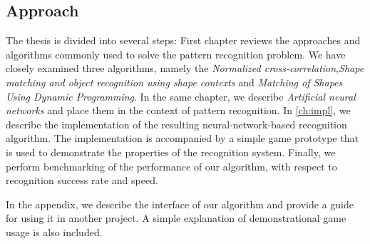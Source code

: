 \subsection{Approach}
The thesis is divided into several steps: First chapter reviews the approaches and algorithms commonly used to solve the pattern recognition problem. We have closely examined three algorithms, namely the \emph{Normalized cross-correlation},\emph{Shape matching and object recognition using shape contexts} and \emph{Matching of Shapes Using Dynamic Programming}. In the same chapter, we describe \emph{Artificial neural networks} and place them in the context of pattern recognition. In \cref{ch:impl}, we describe the implementation of the resulting neural-network-based recognition algorithm. The implementation is accompanied by a simple game prototype that is used to demonstrate the properties of the recognition system. Finally, we perform benchmarking of the performance of our algorithm, with respect to recognition success rate and speed.

In the appendix, we describe the interface of our algorithm and provide a guide for using it in another project. A simple explanation of demonstrational game usage is also included.
